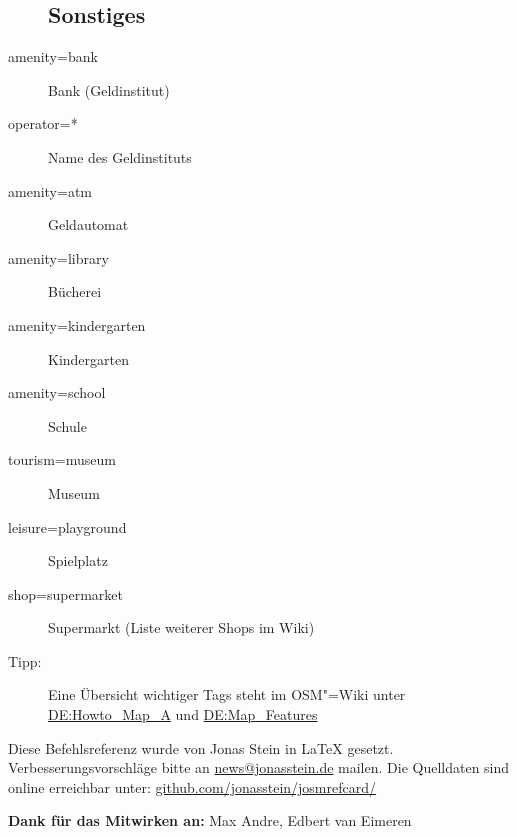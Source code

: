 \documentclass[a4paper,11pt,notumble]{leaflet}
\begin{document}
\begin{flushleft}
\begin{description}
\subsection*{Sonstiges}
\item[amenity=bank] Bank (Geldinstitut)
\item[operator=*] Name des Geldinstituts
\item[amenity=atm] Geldautomat
\item[amenity=library] Bücherei
\item[amenity=kindergarten] Kindergarten
\item[amenity=school] Schule
\item[tourism=museum] Museum
\item[leisure=playground] Spielplatz
\item[shop=supermarket] Supermarkt (Liste weiterer Shops im Wiki)
\\
\item[Tipp:] Eine Übersicht wichtiger Tags steht im OSM"=Wiki unter
\href{http://wiki.osm.org/wiki/DE:Howto_Map_A}{DE:Howto\_Map\_A} und
\href{http://wiki.openstreetmap.org/wiki/DE:Map_Features}{DE:Map\_Features}
\end{description}
\end{flushleft}




Diese Befehlsreferenz wurde von Jonas Stein in \LaTeX{} gesetzt.
Verbesserungsvorschläge bitte an
\href{mailto:news@jonasstein.de}{news@jonasstein.de} mailen.
Die Quelldaten sind online erreichbar unter:
\href{http://github.com/jonasstein/josmrefcard/}{github.com/jonasstein/josmrefcard/}

\textbf{Dank für das Mitwirken an:} Max Andre, Edbert van Eimeren
\end{document}
